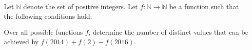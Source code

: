 Let $\mathbb N$ denote the set of positive integers. Let $f: \mathbb N \to \mathbb N$ be a function such that the following conditions hold:
\begin{itemize}
\end{itemize}

Over all possible functions $f$, determine the number of distinct values that can be achieved by $f(2014)+f(2)-f(2016)$.
